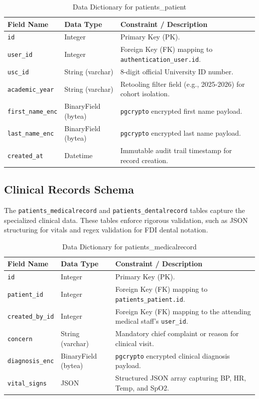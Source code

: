 \begin{table}[htbp]
\centering
\caption{Data Dictionary for patients\_patient}
\begin{tabular}{|l|l|p{7cm}|}
\hline
\textbf{Field Name} & \textbf{Data Type} & \textbf{Constraint / Description} \\
\hline
\texttt{id} & Integer & Primary Key (PK). \\
\hline
\texttt{user\_id} & Integer & Foreign Key (FK) mapping to \texttt{authentication\_user.id}. \\
\hline
\texttt{usc\_id} & String (varchar) & 8-digit official University ID number. \\
\hline
\texttt{academic\_year} & String (varchar) & Retooling filter field (e.g., 2025-2026) for cohort isolation. \\
\hline
\texttt{first\_name\_enc} & BinaryField (bytea) & \texttt{pgcrypto} encrypted first name payload. \\
\hline
\texttt{last\_name\_enc} & BinaryField (bytea) & \texttt{pgcrypto} encrypted last name payload. \\
\hline
\texttt{created\_at} & Datetime & Immutable audit trail timestamp for record creation. \\
\hline
\end{tabular}
\end{table}

\subsection{Clinical Records Schema}
The \texttt{patients\_medicalrecord} and \texttt{patients\_dentalrecord} tables capture the specialized clinical data. These tables enforce rigorous validation, such as JSON structuring for vitals and regex validation for FDI dental notation.

\begin{table}[htbp]
\centering
\caption{Data Dictionary for patients\_medicalrecord}
\begin{tabular}{|l|l|p{7cm}|}
\hline
\textbf{Field Name} & \textbf{Data Type} & \textbf{Constraint / Description} \\
\hline
\texttt{id} & Integer & Primary Key (PK). \\
\hline
\texttt{patient\_id} & Integer & Foreign Key (FK) mapping to \texttt{patients\_patient.id}. \\
\hline
\texttt{created\_by\_id} & Integer & Foreign Key (FK) mapping to the attending medical staff's \texttt{user\_id}. \\
\hline
\texttt{concern} & String (varchar) & Mandatory chief complaint or reason for clinical visit. \\
\hline
\texttt{diagnosis\_enc} & BinaryField (bytea) & \texttt{pgcrypto} encrypted clinical diagnosis payload. \\
\hline
\texttt{vital\_signs} & JSON & Structured JSON array capturing BP, HR, Temp, and SpO2. \\
\hline
\end{tabular}
\end{table}

